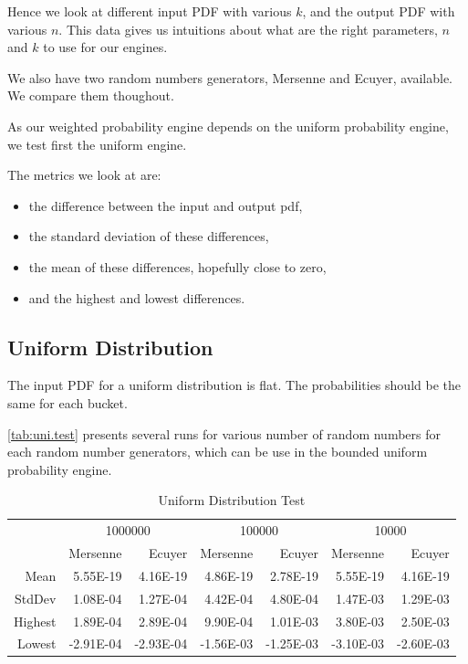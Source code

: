 \documentclass[12pt,a4paper,titlepage]{article}
\begin{document}
Hence we look at different input PDF with various $k$,
and the output PDF with various $n$. 
This data gives us intuitions about what are the right
parameters, $n$ and $k$ to use for our engines.

We also have two random numbers generators, 
Mersenne and Ecuyer, available. We compare them thoughout.

As our weighted probability engine depends on
the uniform probability engine, we test first the uniform engine.

The metrics we look at are:
\begin{itemize}
	\item the difference between the input and output pdf,
	\item the standard deviation of these differences,
	\item the mean of these differences, hopefully close to zero,
	\item and the highest and lowest differences.
\end{itemize}

\subsection{Uniform Distribution}

The input PDF for a uniform distribution is flat. The probabilities
should be the same for each bucket. 

\autoref{tab:uni.test} presents several runs for various number of random
numbers for each random number generators, which can be use in
the bounded uniform probability engine.
\begin{table}[htbp!]
  \centering \tiny
    \begin{tabular}{r|rrrrrr}
    \multicolumn{1}{r}{} & \multicolumn{2}{c}{1000000} & \multicolumn{2}{c}{100000} & \multicolumn{2}{c}{10000} \\
    \multicolumn{1}{r}{} & Mersenne & Ecuyer & Mersenne & Ecuyer & Mersenne & Ecuyer \\
\cmidrule{2-7}    Mean  & 5.55E-19 & 4.16E-19 & 4.86E-19 & 2.78E-19 & 5.55E-19 & 4.16E-19 \\
    StdDev  & 1.08E-04 & 1.27E-04 & 4.42E-04 & 4.80E-04 & 1.47E-03 & 1.29E-03 \\
    Highest  & 1.89E-04 & 2.89E-04 & 9.90E-04 & 1.01E-03 & 3.80E-03 & 2.50E-03 \\
    Lowest  & -2.91E-04 & -2.93E-04 & -1.56E-03 & -1.25E-03 & -3.10E-03 & -2.60E-03 \\
    \end{tabular}%
  \caption{Uniform Distribution Test}
  \label{tab:uni.test}%
\end{table}%
\end{document}
